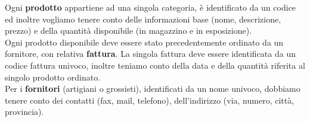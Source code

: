 Ogni \textbf{prodotto} appartiene ad una singola categoria, \`e identificato da un codice ed inoltre vogliamo tenere conto delle informazioni base (nome, descrizione, prezzo) e della quantit\`a disponibile (in magazzino e in esposizione). \\

Ogni prodotto disponibile deve essere stato precedentemente ordinato da un fornitore, con relativa \textbf{fattura}. La singola fattura deve essere identificata da un codice fattura univoco, inoltre teniamo conto della data e della quantit\`a riferita al singolo prodotto ordinato. \\

Per i \textbf{fornitori} (artigiani o grossisti), identificati da un nome univoco, dobbiamo tenere conto dei contatti (fax, mail, telefono), dell'indirizzo (via, numero, città, provincia).



